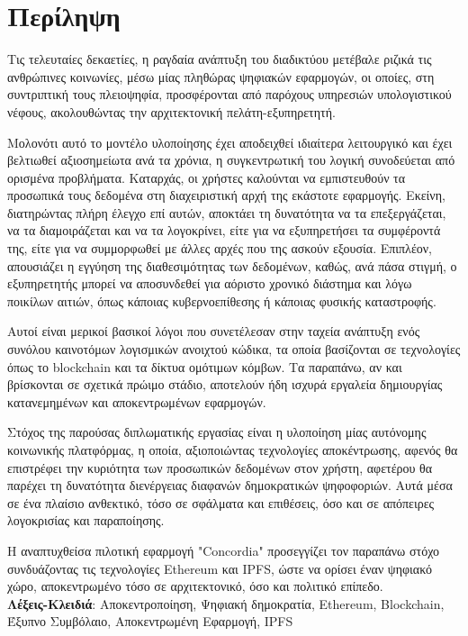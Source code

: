 \chapter*{Περίληψη}

Τις τελευταίες δεκαετίες, η ραγδαία ανάπτυξη του διαδικτύου μετέβαλε ριζικά τις ανθρώπινες
κοινωνίες, μέσω μίας πληθώρας ψηφιακών εφαρμογών, οι οποίες, στη συντριπτική τους πλειοψηφία, προσφέρονται από παρόχους υπηρεσιών υπολογιστικού νέφους, ακολουθώντας την αρχιτεκτονική πελάτη-εξυπηρετητή.

Μολονότι αυτό το μοντέλο υλοποίησης έχει αποδειχθεί ιδιαίτερα λειτουργικό και έχει βελτιωθεί αξιοσημείωτα ανά τα χρόνια, η συγκεντρωτική του λογική συνοδεύεται από ορισμένα προβλήματα. Καταρχάς, οι χρήστες καλούνται να εμπιστευθούν τα προσωπικά τους δεδομένα στη διαχειριστική αρχή της εκάστοτε εφαρμογής. Εκείνη, διατηρώντας πλήρη έλεγχο επί αυτών, αποκτάει τη δυνατότητα να τα επεξεργάζεται, να τα διαμοιράζεται και να τα λογοκρίνει, είτε για να εξυπηρετήσει τα συμφέροντά της, είτε για να συμμορφωθεί με άλλες αρχές που της ασκούν εξουσία. Επιπλέον, απουσιάζει η εγγύηση της διαθεσιμότητας των δεδομένων, καθώς, ανά πάσα στιγμή, ο εξυπηρετητής μπορεί να αποσυνδεθεί για αόριστο χρονικό διάστημα και λόγω ποικίλων αιτιών, όπως κάποιας κυβερνοεπίθεσης ή κάποιας φυσικής καταστροφής.

Αυτοί είναι μερικοί βασικοί λόγοι που συνετέλεσαν στην ταχεία ανάπτυξη ενός συνόλου καινοτόμων λογισμικών ανοιχτού κώδικα, τα οποία βασίζονται σε τεχνολογίες όπως το blockchain και τα δίκτυα ομότιμων κόμβων. Τα παραπάνω, αν και βρίσκονται σε σχετικά πρώιμο στάδιο, αποτελούν ήδη ισχυρά εργαλεία δημιουργίας κατανεμημένων και αποκεντρωμένων εφαρμογών.

Στόχος της παρούσας διπλωματικής εργασίας είναι η υλοποίηση μίας αυτόνομης κοινωνικής πλατφόρμας,
η οποία, αξιοποιώντας τεχνολογίες αποκέντρωσης, αφενός θα επιστρέφει την κυριότητα των προσωπικών
δεδομένων στον χρήστη, αφετέρου θα παρέχει τη δυνατότητα διενέργειας διαφανών δημοκρατικών ψηφοφοριών. Αυτά μέσα σε ένα πλαίσιο ανθεκτικό, τόσο σε σφάλματα και επιθέσεις, όσο και σε απόπειρες λογοκρισίας και παραποίησης.

Η αναπτυχθείσα πιλοτική εφαρμογή "Concordia" προσεγγίζει τον παραπάνω στόχο συνδυάζοντας τις τεχνολογίες Ethereum και IPFS, ώστε να ορίσει έναν ψηφιακό χώρο, αποκεντρωμένο τόσο σε αρχιτεκτονικό, όσο και πολιτικό επίπεδο.
\\[2\baselineskip]
\textbf{Λέξεις-Κλειδιά}: Αποκεντροποίηση, Ψηφιακή δημοκρατία, Ethereum, Blockchain, Έξυπνο Συμβόλαιο, Αποκεντρωμένη Εφαρμογή, IPFS